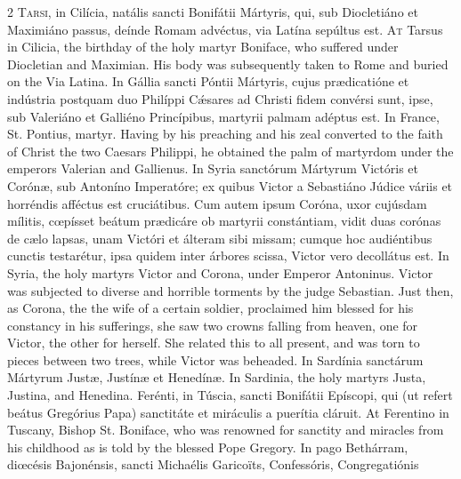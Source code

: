 \begin{paracol}{2}
\lettrine[lines=2]{T}{arsi,} in Cilícia, 
 natális sancti Bonifátii Mártyris, qui, sub Diocletiáno et Maximiáno passus, 
 deínde Romam advéctus, via Latína sepúltus est.
\switchcolumn
{}
\lettrine[lines=2]{A}{t} Tarsus in Cilicia, the birthday 
 of the holy martyr Boniface, who suffered under Diocletian and Maximian. 
 His body was subsequently taken to Rome and buried on the Via Latina.
\switchcolumn*
{}
In Gállia sancti 
 Póntii Mártyris, cujus prædicatióne et indústria postquam duo Philíppi Cǽsares ad Christi fidem convérsi sunt, ipse, sub Valeriáno et Galliéno 
 Princípibus, martyrii palmam adéptus est.
\switchcolumn
{}
In France, St. Pontius, martyr. 
 Having by his preaching and his zeal converted to the faith of Christ the 
 two Caesars Philippi, he obtained the palm of martyrdom under the emperors 
 Valerian and Gallienus.
\switchcolumn*
{}
In Syria sanctórum 
 Mártyrum Victóris et Corónæ, sub Antoníno Imperatóre; ex quibus Victor a 
 Sebastiáno Júdice váriis et horréndis afféctus est cruciátibus. Cum 
 autem ipsum Coróna, uxor cujúsdam mílitis, cœpísset beátum prædicáre ob 
 martyrii constántiam, vidit duas corónas de cælo lapsas, unam Victóri et 
 álteram sibi missam; cumque hoc audiéntibus cunctis testarétur, ipsa quidem 
 inter árbores scissa, Victor vero decollátus est.
\switchcolumn
{}
In Syria, the holy martyrs Victor 
 and Corona, under Emperor Antoninus. Victor was subjected to diverse 
 and horrible torments by the judge Sebastian. Just then, as Corona, 
 the the wife of a certain soldier, proclaimed him blessed for his 
 constancy in his sufferings, she saw two crowns falling from heaven, one for 
 Victor, the other for herself. She related this to all present, and 
 was torn to pieces between two trees, while Victor was beheaded.
\switchcolumn*
{}
In Sardínia sanctárum 
 Mártyrum Justæ, Justínæ et Henedínæ.
\switchcolumn
{}
In Sardinia, the holy martyrs Justa, 
 Justina, and Henedina.
\switchcolumn*
{}
Ferénti, in Túscia, 
 sancti Bonifátii Epíscopi, qui (ut refert beátus Gregórius Papa) sanctitáte 
 et miráculis a puerítia cláruit.
\switchcolumn
{}
At Ferentino in Tuscany, Bishop St. 
 Boniface, who was renowned for sanctity and miracles from his childhood as 
 is told by the blessed Pope Gregory.
\switchcolumn*
{}
In pago Bethárram, 
 diœcésis Bajonénsis, sancti Michaélis Garicoïts, Confessóris, Congregatiónis 

\end{paracol}
